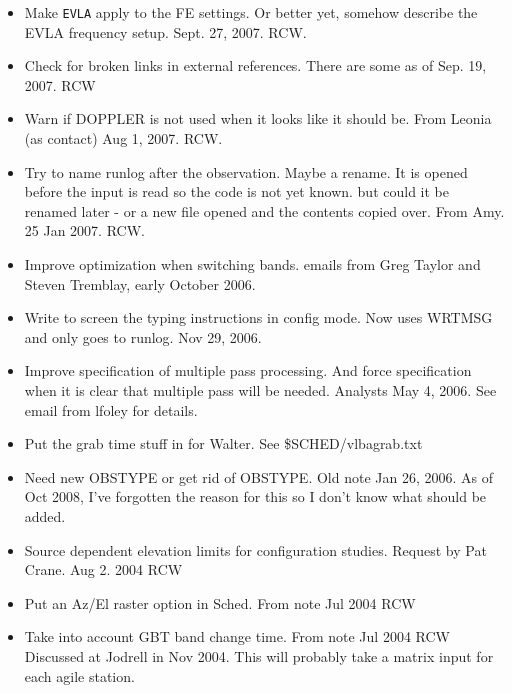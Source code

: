 \documentclass{report}
\begin{document}
\begin{itemize}
\item Make {\tt EVLA} apply to the FE settings.  Or better yet, somehow
      describe the EVLA frequency setup.  Sept. 27, 2007.  RCW.

\item Check for broken links in external references.  There are some
      as of Sep. 19, 2007.  RCW

\item Warn if DOPPLER is not used when it looks like it should be.
      From Leonia (as contact) Aug 1, 2007.  RCW.

\item Try to name runlog after the observation.  Maybe a rename.  It
      is opened before the input is read so the code is not yet known.
      but could it be renamed later - or a new file opened and the
      contents copied over.  From Amy.  25 Jan 2007.  RCW.

\item Improve optimization when switching bands.  emails from Greg Taylor and
      Steven Tremblay, early October 2006.

\item Write to screen the typing instructions in config mode.  Now uses
      WRTMSG and only goes to runlog.  Nov 29, 2006.

\item Improve specification of multiple pass processing.  And force
      specification when it is clear that multiple pass will be needed.
      Analysts  May 4, 2006.  See email from lfoley for details.

\item Put the grab time stuff in for Walter.  See \$SCHED/vlbagrab.txt

\item Need new OBSTYPE or get rid of OBSTYPE.  Old note  Jan 26, 2006.
      As of Oct 2008, I've forgotten the reason for this so I don't
      know what should be added.

\item Source dependent elevation limits for configuration studies.
      Request by Pat Crane.  Aug 2. 2004 RCW

\item Put an Az/El raster option in Sched.  From note Jul 2004 RCW

\item Take into account GBT band change time.  From note Jul 2004 RCW
      Discussed at Jodrell in Nov 2004.  This will probably take a
      matrix input for each agile station.


\end{itemize}
\end{document}
